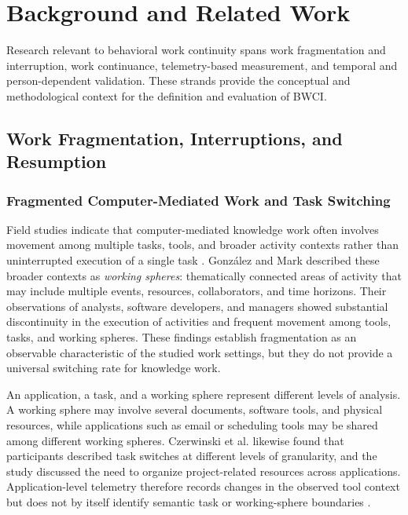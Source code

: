\chapter{Background and Related Work}
\label{chap:related-work}

Research relevant to behavioral work continuity spans work fragmentation and interruption, work continuance, telemetry-based measurement, and temporal and person-dependent validation. These strands provide the conceptual and methodological context for the definition and evaluation of BWCI.

\section{Work Fragmentation, Interruptions, and Resumption}

\subsection{Fragmented Computer-Mediated Work and Task Switching}

Field studies indicate that computer-mediated knowledge work often involves movement among multiple tasks, tools, and broader activity contexts rather than uninterrupted execution of a single task \parencite{gonzalez2004workingSpheres,mark2005fragmentedWork}. González and Mark described these broader contexts as \emph{working spheres}: thematically connected areas of activity that may include multiple events, resources, collaborators, and time horizons. Their observations of analysts, software developers, and managers showed substantial discontinuity in the execution of activities and frequent movement among tools, tasks, and working spheres. These findings establish fragmentation as an observable characteristic of the studied work settings, but they do not provide a universal switching rate for knowledge work.

An application, a task, and a working sphere represent different levels of analysis. A working sphere may involve several documents, software tools, and physical resources, while applications such as email or scheduling tools may be shared among different working spheres. Czerwinski et al. likewise found that participants described task switches at different levels of granularity, and the study discussed the need to organize project-related resources across applications. Application-level telemetry therefore records changes in the observed tool context but does not by itself identify semantic task or working-sphere boundaries \parencite{gonzalez2004workingSpheres,czerwinski2004diary}.

